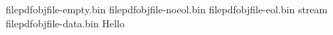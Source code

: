 \ifx\fmtname\undefined
  
  \def\fmtname{basic}
  \expandafter\dump
\fi
{}
\immediate\pdfobj file{pdfobjfile-empty.bin}
\immediate\pdfobj file{pdfobjfile-noeol.bin}
\immediate\pdfobj file{pdfobjfile-eol.bin}
\immediate\pdfobj stream file{pdfobjfile-data.bin}
Hello\bye
